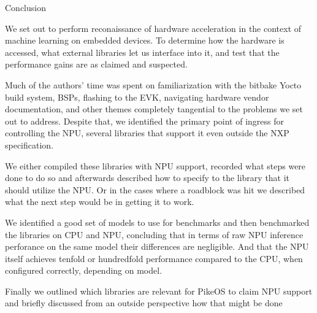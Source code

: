 
\chap Conclusion

We set out to perform reconaissance of
hardware acceleration
in the context of machine learning on embedded devices.
To determine how the hardware is accessed,
what external libraries let us interface into it,
and test that the performance gains are as claimed and suspected.

Much of the authors' time was spent
on familiarization with the bitbake Yocto build system,
BSPs,
flashing to the EVK,
navigating hardware vendor documentation,
and other themes completely tangential
to the problems we set out to address.
Despite that, we identified the primary
point of ingress for controlling the NPU,
several libraries that support it
even outside the NXP specification.

We either compiled these libraries with NPU support,
recorded what steps were done to do so
and afterwards described how to specify to the library
that it should utilize the NPU.
Or in the cases where a roadblock was hit
we described what the next step would
be in getting it to work.

We identified a good set of models to use for benchmarks
and then benchmarked the libraries on CPU and NPU,
concluding that in terms of raw NPU
inference perforance on the same model
their differences are negligible.
And that the NPU itself achieves
tenfold or hundredfold performance compared to the CPU,
when configured correctly,
depending on model.

Finally we outlined which libraries are relevant
for PikeOS to claim NPU support
and briefly discussed from an outside perspective
how that might be done

